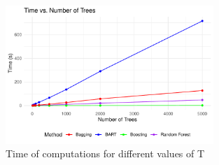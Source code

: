 \documentclass[a4paper,11pt]{article}
\begin{document}
\begin{figure}
  \centering
  \includegraphics[width=0.7\textwidth]{../outputs/time_plot.pdf}
  \caption{Time of computations for different values of T}
  \label{plot_time}
\end{figure}


  

\newpage

\printbibliography
\end{document}
